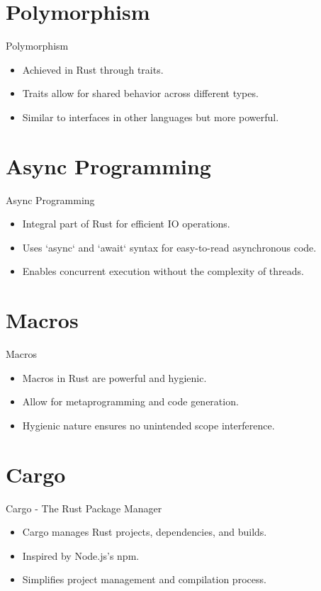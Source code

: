 \documentclass{beamer}
\begin{document}
\section{Polymorphism}
\begin{frame}{Polymorphism}
\begin{itemize}
  \item Achieved in Rust through traits.
  \item Traits allow for shared behavior across different types.
  \item Similar to interfaces in other languages but more powerful.
\end{itemize}
\end{frame}

\section{Async Programming}
\begin{frame}{Async Programming}
\begin{itemize}
  \item Integral part of Rust for efficient IO operations.
  \item Uses `async` and `await` syntax for easy-to-read asynchronous code.
  \item Enables concurrent execution without the complexity of threads.
\end{itemize}
\end{frame}

\section{Macros}
\begin{frame}{Macros}
\begin{itemize}
  \item Macros in Rust are powerful and hygienic.
  \item Allow for metaprogramming and code generation.
  \item Hygienic nature ensures no unintended scope interference.
\end{itemize}
\end{frame}

\section{Cargo}
\begin{frame}{Cargo - The Rust Package Manager}
\begin{itemize}
  \item Cargo manages Rust projects, dependencies, and builds.
  \item Inspired by Node.js's npm.
  \item Simplifies project management and compilation process.
\end{itemize}
\end{frame}
\end{document}
